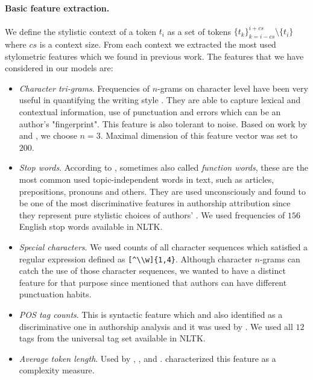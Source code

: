 \documentclass[10pt, a4paper]{article}
\begin{document}
\paragraph{Basic feature extraction.} 
We define the stylistic context of a token $t_i$ as a set of tokens $\{t_k\}_{k=i-cs}^{i+cs}\setminus\{t_i\}$ where $cs$ is a context size. From each context we extracted the most used stylometric features which we found in previous work. The features that we have considered in our models are:
\begin{itemize}
	\item \emph{Character tri-grams}. Frequencies of $n$-grams on character level have been very useful in quantifying the writing style \citep{stamatatos-2009b}. They are able to capture lexical and contextual information, use of punctuation and errors which can be an author's "fingerprint". This feature is also tolerant to noise. Based on work by \citet{stamatatos-2009a} and \citet{rahman-2015}, we choose $n=3$. Maximal dimension of this feature vector was set to $200$.
	\item \emph{Stop words}. According to \citet{stamatatos-2009a}, sometimes also called \emph{function words}, these are the most common used topic-independent words in text, such as articles, prepositions, pronouns and others. They are used unconsciously and found to be one of the most discriminative features in authorship attribution since they represent pure stylistic choices of authors' \citep{burrows-1987,argamon-2005}. We used frequencies of $156$ English stop words available in NLTK.
	\item \emph{Special characters}. We used counts of all character sequences which satisfied a regular expression defined as \verb/[^\\w]{1,4}/. Although character $n$-grams can catch the use of those character sequences, we wanted to have a distinct feature for that purpose since \citet{koppel-2009} mentioned that authors can have different punctuation habits.
	\item \emph{POS tag counts}. This is syntactic feature which \citet{koppel-2009} and \citet{stamatatos-2009a} also identified as a discriminative one in authorship analysis and it was used by \citet{kuznetsov-2016}. We used all $12$ tags from the universal tag set available in NLTK.
	\item \emph{Average token length}. Used by \citet{kuznetsov-2016}, \citet{sittar-2016},  \citet{brooke-2012} and \citet{stein-2011}. \citet{koppel-2009} characterized this feature as a complexity measure.

\end{itemize}
\end{document}
